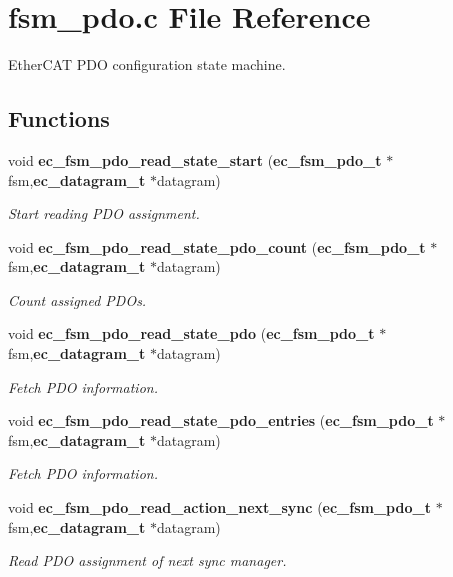 \section{fsm\-\_\-pdo.\-c \-File \-Reference}
\label{fsm__pdo_8c}


\-Ether\-C\-A\-T \-P\-D\-O configuration state machine.  


\subsection*{\-Functions}
\begin{DoxyCompactItemize}
\item 
void {\bf ec\-\_\-fsm\-\_\-pdo\-\_\-read\-\_\-state\-\_\-start} ({\bf ec\-\_\-fsm\-\_\-pdo\-\_\-t} $\ast$fsm,{\bf ec\-\_\-datagram\-\_\-t} $\ast$datagram)
\begin{DoxyCompactList}\small\item\em \-Start reading \-P\-D\-O assignment. \end{DoxyCompactList}\item 
void {\bf ec\-\_\-fsm\-\_\-pdo\-\_\-read\-\_\-state\-\_\-pdo\-\_\-count} ({\bf ec\-\_\-fsm\-\_\-pdo\-\_\-t} $\ast$fsm,{\bf ec\-\_\-datagram\-\_\-t} $\ast$datagram)
\begin{DoxyCompactList}\small\item\em \-Count assigned \-P\-D\-Os. \end{DoxyCompactList}\item 
void {\bf ec\-\_\-fsm\-\_\-pdo\-\_\-read\-\_\-state\-\_\-pdo} ({\bf ec\-\_\-fsm\-\_\-pdo\-\_\-t} $\ast$fsm,{\bf ec\-\_\-datagram\-\_\-t} $\ast$datagram)
\begin{DoxyCompactList}\small\item\em \-Fetch \-P\-D\-O information. \end{DoxyCompactList}\item 
void {\bf ec\-\_\-fsm\-\_\-pdo\-\_\-read\-\_\-state\-\_\-pdo\-\_\-entries} ({\bf ec\-\_\-fsm\-\_\-pdo\-\_\-t} $\ast$fsm,{\bf ec\-\_\-datagram\-\_\-t} $\ast$datagram)
\begin{DoxyCompactList}\small\item\em \-Fetch \-P\-D\-O information. \end{DoxyCompactList}\item 
void {\bf ec\-\_\-fsm\-\_\-pdo\-\_\-read\-\_\-action\-\_\-next\-\_\-sync} ({\bf ec\-\_\-fsm\-\_\-pdo\-\_\-t} $\ast$fsm,{\bf ec\-\_\-datagram\-\_\-t} $\ast$datagram)
\begin{DoxyCompactList}\small\item\em \-Read \-P\-D\-O assignment of next sync manager. \end{DoxyCompactList}\item 

\end{DoxyCompactItemize}

